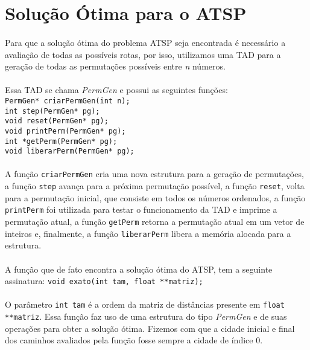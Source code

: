 \documentclass[12pt,a4paper]{article}
\begin{document}
 \newpage
 \section{Solução Ótima para o ATSP}
  {\paragraph{} Para que a solução ótima do problema ATSP seja encontrada é necessário a avaliação de todas as possíveis rotas, por isso, utilizamos uma TAD para a geração de todas as permutações possíveis entre \emph{n} números.}
  {\paragraph{} Essa TAD se chama \emph{PermGen} e possui as seguintes funções:\\
  {\tt PermGen* criarPermGen(int n);}\\
  {\tt int step(PermGen* pg);}\\
  {\tt void reset(PermGen* pg);}\\
  {\tt void printPerm(PermGen* pg);}\\
  {\tt int *getPerm(PermGen* pg);}\\
  {\tt void liberarPerm(PermGen* pg);}}
  {\paragraph{} A função {\tt criarPermGen} cria uma nova estrutura para a geração de permutações, a função {\tt step} avança para a próxima permutação possível,
  a função {\tt reset}, volta para a permutação inicial, que consiste em todos os números ordenados, a função {\tt printPerm}
  foi utilizada para testar o funcionamento da TAD e imprime a permutação atual, a função {\tt getPerm} retorna a permutação atual
  em um vetor de inteiros e, finalmente, a função {\tt liberarPerm} libera a memória alocada para a estrutura.}
  {\paragraph{} A função que de fato encontra a solução ótima do ATSP, tem a seguinte assinatura: {\tt void exato(int tam, float **matriz);}}
  {\paragraph{} O parâmetro {\tt int tam} é a ordem da matriz de distâncias presente em {\tt float **matriz}. Essa função faz uso de uma estrutura
  do tipo \emph{PermGen} e de suas operações para obter a solução ótima. Fizemos com que a cidade inicial e final dos caminhos
  avaliados pela função fosse sempre a cidade de índice 0.}
\end{document}
